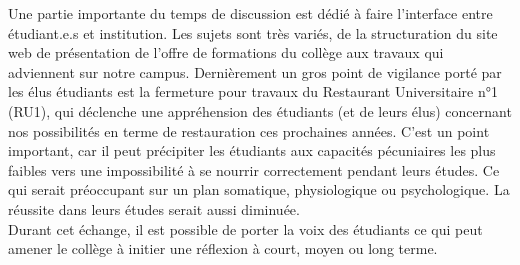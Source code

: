 \documentclass{article}
\begin{document}
Une partie importante du temps de discussion est dédié à faire l'interface entre étudiant.e.s et institution. 
Les sujets sont très variés, de la structuration du site web de présentation de l'offre de formations du collège aux travaux qui adviennent sur notre campus. 
Dernièrement un gros point de vigilance porté par les élus étudiants est la fermeture pour travaux du Restaurant Universitaire n°1 (RU1), qui déclenche une appréhension des étudiants (et de leurs élus) concernant nos possibilités en terme de restauration ces prochaines années.
C'est un point important, car il peut précipiter les étudiants aux capacités pécuniaires les plus faibles vers une impossibilité à se nourrir correctement pendant leurs études. 
Ce qui serait préoccupant sur un plan somatique, physiologique ou psychologique. 
La réussite dans leurs études serait aussi diminuée. \\ 
Durant cet échange, il est possible de porter la voix des étudiants ce qui peut amener le collège à initier une réflexion à court, moyen ou long terme.
\end{document}
